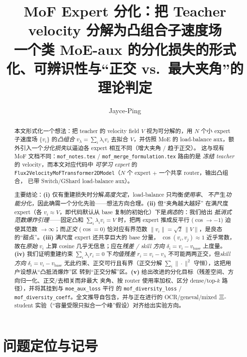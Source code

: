 \documentclass[11pt,a4paper]{article}
\title{\textbf{MoF Expert 分化：把 Teacher velocity 分解为凸组合子速度场}\\[0.3em]
\large 一个类 MoE-aux 的分化损失的形式化、可辨识性与``正交 vs.\ 最大夹角''的理论判定}
\author{Jayce-Ping}
\date{}
\newcommand{\base}{\mathrm{base}}
\newcommand{\vbase}{v_{\base}}
\theoremstyle{definition}
\begin{document}
\maketitle

\begin{abstract}
本文形式化一个想法：把 teacher 的 velocity field $V$ 视为可分解的，用 $N$ 个小 expert
子速度场 $\{v_i\}$ 的\emph{凸组合} $v_\lambda=\sum_i \lambda_i v_i$ 去拟合 $V$，并仿照 MoE 的
load-balance aux，额外引入一个\emph{分化损失}以逼迫各 expert 相互不同（增大夹角 / 趋于正交）。
这与现有 MoF 文档不同：\texttt{mof\_notes.tex} / \texttt{mof\_merge\_formulation.tex} 路由的是
\emph{冻结 teacher} 的 velocity，而本文对应代码中 \emph{可学习 expert} 的
\texttt{Flux2VelocityMoFTransformer2DModel}（$N$ 个 expert $+$ 一个共享 router，输出凸组合，
已带 Switch/GShard load-balance aux）。

主要结论：\textbf{(i)} 仅有重建损失时分解\emph{高度欠定}，load-balance 只均衡\emph{使用率}、
不产生\emph{功能分化}，因此确需一个分化先验——想法方向合理。\textbf{(ii)} 但``夹角越大越好''
在满尺度 expert（各 $v_i\approx V$，即代码默认从 base 复制的初始化）下是\emph{病态}的：我们给出
\emph{抵消式范数爆炸引理}——固定凸和 $\sum_i\lambda_i v_i=V$ 时，把两 expert 推成反平行
($\cos\to-1$) 迫使其范数 $\to\infty$；而\emph{正交} ($\cos=0$) 恰对应有界范数
$\|v_i\|=\sqrt2\,\|V\|$，是良态的``甜点''。\textbf{(iii)} 满尺度 expert 还共享巨大的 base 分量，
$\cos(v_i,v_j)\approx1$ 近乎常数，故在\emph{原始} $v_i$ 上算 cosine 几乎无信息；应在\emph{残差 /
skill 方向} $\delta_i=v_i-\vbase$ 上度量。\textbf{(iv)} 我们证明重建约束 $\sum_i\lambda_i r_i=0$
下\emph{均值残差} $r_i=v_i-v_\lambda$ 不可能两两正交，但\emph{skill 方向} $\delta_i=v_i-\vbase$
无此约束、正交可行且有界（正交分解 $\sum_i\|\cdot\|^2$ 守恒），这把用户设想从``凸抵消爆炸''区
转到``正交分解''区。\textbf{(v)} 给出改进的分化目标（残差空间、方向归一化、正交/去相关而非最大
夹角、按 router 使用率加权、区分 dense/top-$k$ 路径），并将其挂到与 \texttt{moe\_aux\_loss} 平行
的 \texttt{mof\_diversity\_loss} / \texttt{mof\_diversity\_coeff}。全文推导自包含，并与正在进行的
OCR/geneval/mixed 三-student 实验（``容量受限只拟合一个峰''假设）对齐给出实验方向。
\end{abstract}

\tableofcontents
\newpage

\section{问题定位与记号}
\label{sec:setup}
\end{document}
